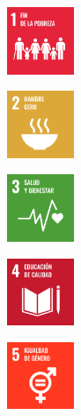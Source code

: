 \begin{titlepage}
    \vspace*{1cm}
    \begin{figure}[h]
    \centering
        \begin{subfigure}[b]{0.135\textwidth}
            \includegraphics[width=2cm, height=2cm]{images/iconos_ods/01.png}
        \end{subfigure}
        \begin{subfigure}[b]{0.135\textwidth}
            \includegraphics[width=2cm, height=2cm]{images/iconos_ods/02.png}
        \end{subfigure}
        \begin{subfigure}[b]{0.135\textwidth}
            \includegraphics[width=2cm, height=2cm]{images/iconos_ods/03.png}
        \end{subfigure}
        \begin{subfigure}[b]{0.135\textwidth}
            \includegraphics[width=2cm, height=2cm]{images/iconos_ods/04.png}
        \end{subfigure}
        \begin{subfigure}[b]{0.135\textwidth}
            \includegraphics[width=2cm, height=2cm]{images/iconos_ods/05.png}
        \end{subfigure}
        
        \label{fig:ods-iconos}
    \end{figure}
    

\end{titlepage}
